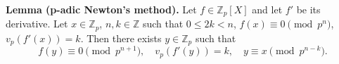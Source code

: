 \textbf{Lemma (p-adic Newton's method).} Let $f \in \mathbb{Z}_p[X]$ and let $f'$ be its derivative. Let $x \in \mathbb{Z}_p$, $n, k \in \mathbb{Z}$ such that $0 \leq 2k < n$, $f(x) \equiv 0 \pmod{p^n}$, $v_p(f'(x)) = k$. Then there exists $y \in \mathbb{Z}_p$ such that
$$f(y) \equiv 0 \pmod{p^{n+1}}, \quad v_p(f'(y)) = k, \quad y \equiv x \pmod{p^{n-k}}.$$
